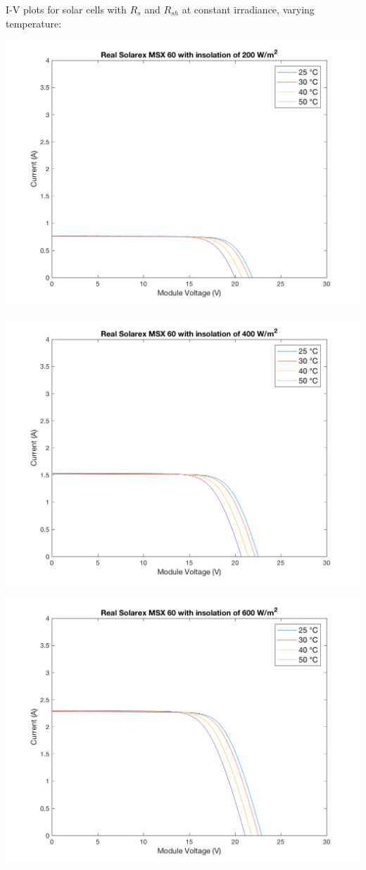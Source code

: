 \documentclass[fleqn]{article}
\begin{document}
\begin{enumerate}
  I-V plots for solar cells with $R_s$ and $R_{sh}$ at constant irradiance, varying temperature:
  \begin{center}
    \includegraphics[width=0.9\linewidth]{200W-r.png}
  \end{center}
  \begin{center}
    \includegraphics[width=0.9\linewidth]{400W-r.png}
  \end{center}
  \begin{center}
    \includegraphics[width=0.9\linewidth]{600W-r.png}

\end{center}
\end{enumerate}
\end{document}
